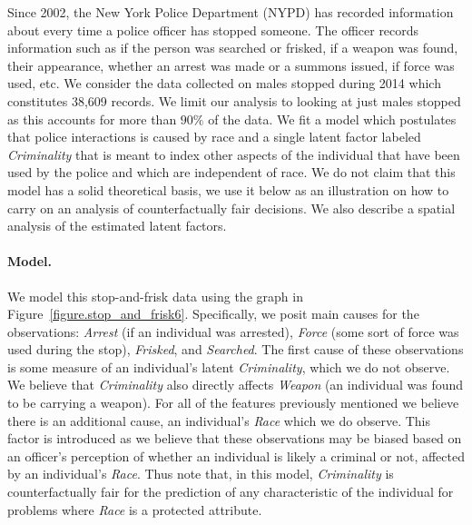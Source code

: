 Since 2002, the New York Police Department (NYPD) has recorded
information about every time a police officer has stopped someone. The
officer records information such as if the person was searched or
frisked, if a weapon was found, their appearance, whether an arrest
was made or a summons issued,  if force was used, etc. 
We consider the data collected on males stopped during 2014 which constitutes
38,609 records. We limit our analysis to looking at just males
stopped as this accounts for more than $90\%$ of the data.  We fit a
model which postulates that police interactions is caused by race and a 
single latent factor labeled \emph{Criminality} that is meant to index other aspects
of the individual that have been used by the police and which are independent of race.
We do not claim that this model has a solid theoretical basis, we use it below as an illustration
on how to carry on an analysis of  counterfactually fair decisions. We also describe a spatial analysis of
the estimated latent factors.


\paragraph{Model.}
We model this stop-and-frisk data using the graph in
Figure~\ref{figure.stop_and_frisk6}. Specifically, we posit main causes
for the observations: \emph{Arrest} (if an individual was arrested),
\emph{Force} (some sort of force was used during the stop),
\emph{Frisked}, and \emph{Searched}. The first cause of these
observations is some measure of an individual's latent
\emph{Criminality}, which we do not observe. We believe that \emph{Criminality} also directly affects \emph{Weapon} (an individual was found to be carrying a weapon). For all of the features previously mentioned we believe there is an additional cause, an individual's \emph{Race} which we do observe. This factor is introduced
as we believe that these observations may be biased based on an
officer's perception of whether an individual is likely a criminal or
not, affected by an individual's \emph{Race}. Thus note that, in this model, \emph{Criminality} is counterfactually fair for the prediction of any characteristic
of the individual for problems where \emph{Race} is a protected attribute.

